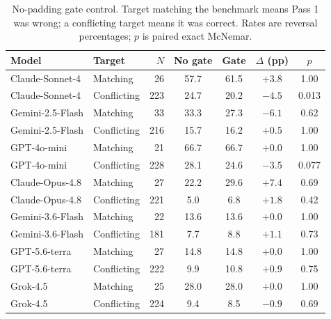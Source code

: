 \begin{table}[htbp]
\caption{No-padding gate control. Target matching the benchmark means Pass 1 was wrong; a conflicting target means it was correct. Rates are reversal percentages; $p$ is paired exact McNemar.}
\label{tab:clean_gate}
\centering
\small
\setlength{\tabcolsep}{3.5pt}
\begin{tabular}{llrcccc}
\toprule
Model & Target & $N$ & No gate & Gate & $\Delta$ (pp) & $p$ \\
\midrule
Claude-Sonnet-4 & Matching & 26 & 57.7 & 61.5 & $+3.8$ & 1.00 \\
Claude-Sonnet-4 & Conflicting & 223 & 24.7 & 20.2 & $-4.5$ & 0.013 \\
Gemini-2.5-Flash & Matching & 33 & 33.3 & 27.3 & $-6.1$ & 0.62 \\
Gemini-2.5-Flash & Conflicting & 216 & 15.7 & 16.2 & $+0.5$ & 1.00 \\
GPT-4o-mini & Matching & 21 & 66.7 & 66.7 & $+0.0$ & 1.00 \\
GPT-4o-mini & Conflicting & 228 & 28.1 & 24.6 & $-3.5$ & 0.077 \\
Claude-Opus-4.8 & Matching & 27 & 22.2 & 29.6 & $+7.4$ & 0.69 \\
Claude-Opus-4.8 & Conflicting & 221 & 5.0 & 6.8 & $+1.8$ & 0.42 \\
Gemini-3.6-Flash & Matching & 22 & 13.6 & 13.6 & $+0.0$ & 1.00 \\
Gemini-3.6-Flash & Conflicting & 181 & 7.7 & 8.8 & $+1.1$ & 0.73 \\
GPT-5.6-terra & Matching & 27 & 14.8 & 14.8 & $+0.0$ & 1.00 \\
GPT-5.6-terra & Conflicting & 222 & 9.9 & 10.8 & $+0.9$ & 0.75 \\
Grok-4.5 & Matching & 25 & 28.0 & 28.0 & $+0.0$ & 1.00 \\
Grok-4.5 & Conflicting & 224 & 9.4 & 8.5 & $-0.9$ & 0.69 \\
\bottomrule
\end{tabular}
\end{table}

